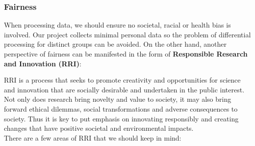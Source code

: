 \subsubsection{Fairness}
When processing data, we should ensure no societal, racial or health bias is involved. Our project collects minimal personal data so the problem of differential processing for distinct groups can be avoided. 
On the other hand, another perspective of fairness can be manifested in the form of \textbf{Responsible Research and Innovation (RRI)}:

RRI is a process that seeks to promote creativity and opportunities for science and innovation that are socially desirable and undertaken in the public interest.\cite{ukri} Not only does research bring novelty 
and value to society, it may also bring forward ethical dilemmas, social transformations and adverse consequences to society. Thus it is key to put emphasis on innovating responsibly and creating changes that
have positive societal and environmental impacts.\\ There are a few areas of RRI that we should keep in mind:
